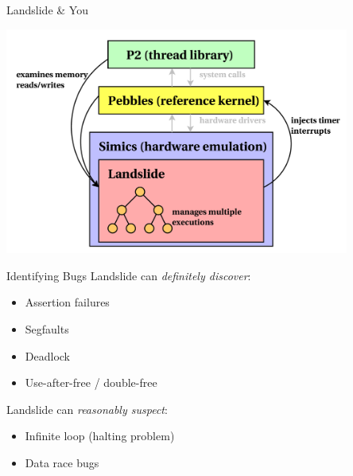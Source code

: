 \documentclass[xcolor=dvipsnames]{beamer}
\begin{document}
\begin{frame}{Landslide \& You}
	\begin{center}
	\includegraphics[width=0.85\textwidth]{landslide-new.pdf}
	\end{center}
\end{frame}

\begin{frame}{Identifying Bugs}
	Landslide can {\em definitely discover}:
	\begin{itemize}
		\item Assertion failures %
		\item Segfaults
		\item Deadlock
		\item Use-after-free / double-free
	\end{itemize}
	\linegap
	Landslide can {\em reasonably suspect}:
	\begin{itemize}
		\item Infinite loop (halting problem)
		\item Data race bugs
	\end{itemize}
\end{frame}
\end{document}
